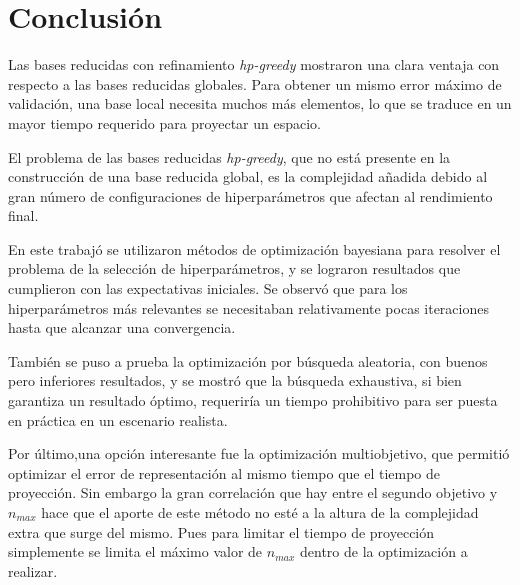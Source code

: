 \chapter{Conclusión}

Las bases reducidas con refinamiento \textit{hp-greedy} mostraron una clara ventaja con respecto a las bases reducidas globales. Para obtener un mismo error máximo de validación, una base local necesita muchos más elementos, lo que se traduce en un mayor tiempo requerido para proyectar un espacio.

El problema de las bases reducidas \textit{hp-greedy}, que no está presente en la construcción de una base reducida global, es la complejidad añadida debido al gran número de configuraciones de hiperparámetros que afectan al rendimiento final. 


En este trabajó se utilizaron métodos de optimización bayesiana para resolver el problema de la selección de hiperparámetros, y se lograron resultados que cumplieron con las expectativas iniciales. Se observó que para los hiperparámetros más relevantes se necesitaban relativamente pocas iteraciones hasta que alcanzar una convergencia.

También se puso a prueba la optimización por búsqueda aleatoria, con buenos pero inferiores resultados, y se mostró que la búsqueda exhaustiva, si bien garantiza un resultado óptimo, requeriría un tiempo prohibitivo para ser puesta en práctica en un escenario realista.


Por último,una opción interesante fue la optimización multiobjetivo, que permitió optimizar el error de representación al mismo tiempo que el tiempo de proyección. Sin embargo la gran correlación que hay entre el segundo objetivo y $n_{max}$ hace que el aporte de este método no esté a la altura de la complejidad extra que surge del mismo. Pues para limitar el tiempo de proyección simplemente se limita el máximo valor de $n_{max}$ dentro de la optimización a realizar.



